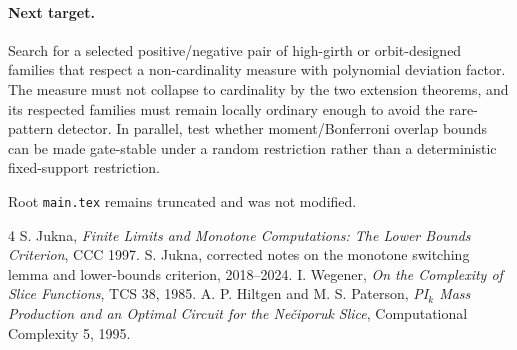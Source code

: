 \documentclass[11pt]{article}
\begin{document}
\paragraph{Next target.}
Search for a selected positive/negative pair of high-girth or orbit-designed families that respect a non-cardinality measure with polynomial deviation factor. The measure must not collapse to cardinality by the two extension theorems, and its respected families must remain locally ordinary enough to avoid the rare-pattern detector. In parallel, test whether moment/Bonferroni overlap bounds can be made gate-stable under a random restriction rather than a deterministic fixed-support restriction.

Root \texttt{main.tex} remains truncated and was not modified.

\begin{thebibliography}{4}
 S. Jukna, \emph{Finite Limits and Monotone Computations: The Lower Bounds Criterion}, CCC 1997.
 S. Jukna, corrected notes on the monotone switching lemma and lower-bounds criterion, 2018--2024.
 I. Wegener, \emph{On the Complexity of Slice Functions}, TCS 38, 1985.
 A. P. Hiltgen and M. S. Paterson, \emph{PI$_k$ Mass Production and an Optimal Circuit for the Ne\v{c}iporuk Slice}, Computational Complexity 5, 1995.
\end{thebibliography}
\end{document}
